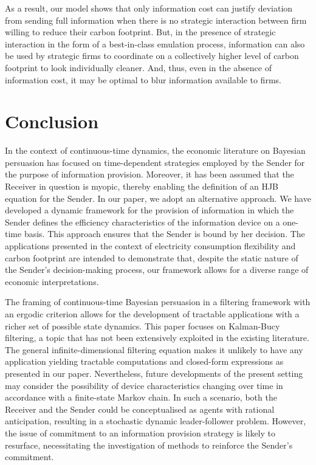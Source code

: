 \documentclass[a4paper,10pt]{article}
\theoremstyle{definition}
\theoremstyle{plain}
\numberwithin{equation}{section}
\begin{document}
\medskip

As a result, our model shows that only information cost can justify deviation from sending full information when there is no strategic interaction between firm willing to reduce their carbon footprint. But, in the presence of strategic interaction in the form of a best-in-class emulation process, information can also be used by strategic firms to coordinate on a collectively higher level of carbon footprint to look individually cleaner. And, thus, even in the absence of information cost, it may be optimal to blur information available to firms. 




\section{Conclusion}\label{sec:conclusion}

In the context of continuous-time dynamics, the economic literature on Bayesian persuasion has focused on time-dependent strategies employed by the Sender for the purpose of information provision. Moreover, it has been assumed that the Receiver in question is myopic, thereby enabling the definition of an HJB equation for the Sender. In our paper, we adopt an alternative approach. We have developed a dynamic framework for the provision of information in which the Sender defines the efficiency characteristics of the information device on a one-time basis. This approach ensures that the Sender is bound by her decision. The applications presented in the context of electricity consumption flexibility and carbon footprint are intended to demonstrate that, despite the static nature of the Sender's decision-making process, our framework allows for a diverse range of economic interpretations.  

The framing of continuous-time Bayesian persuasion in a filtering framework with an ergodic criterion allows for the development of tractable applications with a richer set of possible state dynamics. This paper focuses on Kalman-Bucy filtering, a topic that has not been extensively exploited in the existing literature. The general infinite-dimensional filtering equation makes it unlikely to have any application yielding tractable computations and closed-form expressions as presented in our paper. Nevertheless, future developments of the present setting may consider the possibility of device characteristics changing over time in accordance with a finite-state Markov chain. In such a scenario, both the Receiver and the Sender could be conceptualised as agents with rational anticipation, resulting in a stochastic dynamic leader-follower problem. However, the issue of commitment to an information provision strategy is likely to resurface, necessitating the investigation of methods to reinforce the Sender's commitment. 
\end{document}
